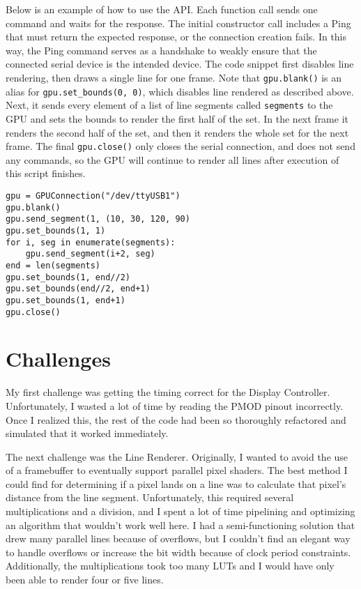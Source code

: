 \documentclass[11pt,conference]{IEEEtran}
\newcommand{\function}[2]{\texttt{#1(#2)}}
\begin{document}
Below is an example of how to use the API\@.
Each function call sends one command and waits for the response.
The initial constructor call includes a Ping that must return the expected response, or the connection creation fails.
In this way, the Ping command serves as a handshake to weakly ensure that the connected serial device is the intended device.
The code snippet first disables line rendering, then draws a single line for one frame.
Note that \function{gpu.blank}{} is an alias for \function{gpu.set\_bounds}{0, 0}, which disables line rendered as described above.
Next, it sends every element of a list of line segments called \texttt{segments} to the GPU and sets the bounds to render the first half of the set.
In the next frame it renders the second half of the set, and then it renders the whole set for the next frame.
The final \function{gpu.close}{} only closes the serial connection, and does not send any commands, so the GPU will continue to render all lines after execution of this script finishes.

\begin{verbatim}
gpu = GPUConnection("/dev/ttyUSB1")
gpu.blank()
gpu.send_segment(1, (10, 30, 120, 90)
gpu.set_bounds(1, 1)
for i, seg in enumerate(segments):
	gpu.send_segment(i+2, seg)
end = len(segments)
gpu.set_bounds(1, end//2)
gpu.set_bounds(end//2, end+1)
gpu.set_bounds(1, end+1)
gpu.close()
\end{verbatim}

\section{Challenges}
My first challenge was getting the timing correct for the Display Controller.
Unfortunately, I wasted a lot of time by reading the PMOD pinout incorrectly.
Once I realized this, the rest of the code had been so thoroughly refactored and simulated that it worked immediately.

The next challenge was the Line Renderer.
Originally, I wanted to avoid the use of a framebuffer to eventually support parallel pixel shaders.
The best method I could find for determining if a pixel lands on a line was to calculate that pixel's distance from the line segment.
Unfortunately, this required several multiplications and a division, and I spent a lot of time pipelining and optimizing an algorithm that wouldn't work well here.
I had a semi-functioning solution that drew many parallel lines because of overflows, but I couldn't find an elegant way to handle overflows or increase the bit width because of clock period constraints.
Additionally, the multiplications took too many LUTs and I would have only been able to render four or five lines.
\end{document}
